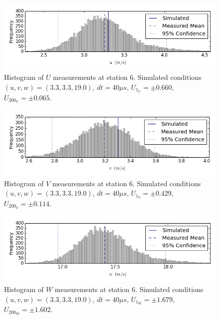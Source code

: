 \begin{figure}[H]
\centering
\includegraphics[width=6in]{figs/Ely_May28th06002/uncertainty_Ely_May28th06002_U}
\caption{Histogram of $U$ measurements at station 6. Simulated conditions 
$(u,v,w)=(3.3, 3.3, 19.0)$, $dt=40 \mu s$, $U_{1_{U}}=\pm 0.660$, 
$U_{200_{U}}=\pm 0.065$.}
\label{fig:uncertainty_Ely_May28th06002_U}
\end{figure}


\begin{figure}[H]
\centering
\includegraphics[width=6in]{figs/Ely_May28th06002/uncertainty_Ely_May28th06002_V}
\caption{Histogram of $V$ measurements at station 6. Simulated conditions 
$(u,v,w)=(3.3, 3.3, 19.0)$, $dt=40 \mu s$, $U_{1_{V}}=\pm 0.429$, 
$U_{200_{V}}=\pm 0.114$.}
\label{fig:uncertainty_Ely_May28th06002_V}
\end{figure}


\begin{figure}[H]
\centering
\includegraphics[width=6in]{figs/Ely_May28th06002/uncertainty_Ely_May28th06002_W}
\caption{Histogram of $W$ measurements at station 6. Simulated conditions 
$(u,v,w)=(3.3, 3.3, 19.0)$, $dt=40 \mu s$, $U_{1_{W}}=\pm 1.679$, 
$U_{200_{W}}=\pm 1.602$.}
\label{fig:uncertainty_Ely_May28th06002_W}
\end{figure}


